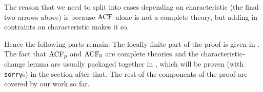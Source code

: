 The reason that we need to split into cases depending on characteristic
(the final two arrows above) is because $\operatorname{ACF}$ alone is not a complete theory,
but adding in contraints on characteristic makes it so.

Hence the following parts remain:
The locally finite part of the proof is given in
.
The fact that $\operatorname{ACF}_{p}$ and $\operatorname{ACF}_{0}$ are {complete theories} and the
{characteristic-change lemma} are usually packaged together
in , %
which will be proven (with \texttt{sorry}s) in the section after that.
The rest of the components of the proof are covered by our work so far.
